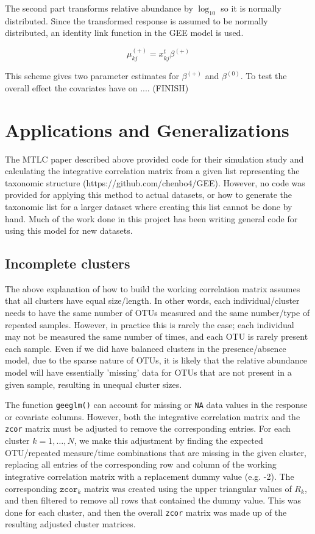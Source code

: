 \documentclass[12pt]{article}
\begin{document}
The second part transforms relative abundance by $\log_{10}$ so it is normally distributed. Since the transformed response is assumed to be normally distributed, an identity link function in the GEE model is used.

$$\mu_{kj}^{(+)} = x_{kj}^t \beta^{(+)}$$


This scheme gives two parameter estimates for $\beta^{(+)}$ and $\beta^{(0)}$. To test the overall effect the covariates have on .... (FINISH)



\section{Applications and Generalizations}

The MTLC paper described above \cite{chen2020generalized} provided code for their simulation study and calculating the integrative correlation matrix from a given list representing the taxonomic structure (https://github.com/chenbo4/GEE). However, no code was provided for applying this method to actual datasets, or how to generate the taxonomic list for a larger dataset where creating this list cannot be done by hand. Much of the work done in this project has been writing general code for using this model for new datasets.

\subsection{Incomplete clusters}
The above explanation of how to build the working correlation matrix assumes that all clusters have equal size/length. In other words, each individual/cluster needs to have the same number of OTUs measured and the same number/type of repeated samples. However, in practice this is rarely the case; each individual may not be measured the same number of times, and each OTU is rarely present each sample. Even if we did have balanced clusters in the presence/absence model, due to the sparse nature of OTUs, it is likely that the relative abundance model will have essentially 'missing' data for OTUs that are not present in a given sample, resulting in unequal cluster sizes.

The function \texttt{geeglm()} can account for missing or \texttt{NA} data values in the response or covariate columns. However, both the integrative correlation matrix and the \texttt{zcor} matrix must be adjusted to remove the corresponding entries. For each cluster $k = 1, \ldots , N$, we make this adjustment by finding the expected OTU/repeated measure/time combinations that are missing in the given cluster, replacing all entries of the corresponding row and column of the working integrative correlation matrix with a replacement dummy value (e.g. -2). The corresponding $\texttt{zcor}_k$ matrix was created using the upper triangular values of $R_k$, and then filtered to remove all rows that contained the dummy value. This was done for each cluster, and then the overall \texttt{zcor} matrix was made up of the resulting adjusted cluster matrices.
\end{document}
